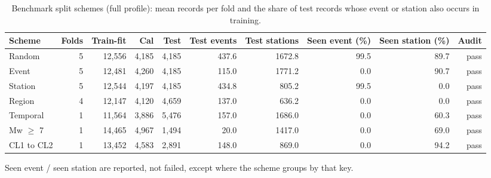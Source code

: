 \begin{table}[htbp]
\centering
\caption{Benchmark split schemes (full profile): mean records per fold and the share of test records whose event or station also occurs in training.}
\label{tab:table2_splits}
\small
\begin{adjustbox}{max width=6.25in}
\begin{tabular}{lrrrrrrrrr}
\toprule
Scheme & Folds & Train-fit & Cal & Test & Test events & Test stations & Seen event (\%) & Seen station (\%) & Audit \\
\midrule
Random & 5 & 12,556 & 4,185 & 4,185 & 437.6 & 1672.8 & 99.5 & 89.7 & pass \\
Event & 5 & 12,481 & 4,260 & 4,185 & 115.0 & 1771.2 & 0.0 & 90.7 & pass \\
Station & 5 & 12,544 & 4,197 & 4,185 & 434.8 & 805.2 & 99.5 & 0.0 & pass \\
Region & 4 & 12,147 & 4,120 & 4,659 & 137.0 & 636.2 & 0.0 & 0.0 & pass \\
Temporal & 1 & 11,564 & 3,886 & 5,476 & 157.0 & 1686.0 & 0.0 & 60.3 & pass \\
Mw $\geq$ 7 & 1 & 14,465 & 4,967 & 1,494 & 20.0 & 1417.0 & 0.0 & 69.0 & pass \\
CL1 to CL2 & 1 & 13,452 & 4,583 & 2,891 & 148.0 & 869.0 & 0.0 & 94.2 & pass \\
\bottomrule
\end{tabular}
\end{adjustbox}
\par\smallskip
\parbox{6.25in}{\footnotesize Seen event / seen station are reported, not failed, except where the scheme groups by that key.}
\end{table}
